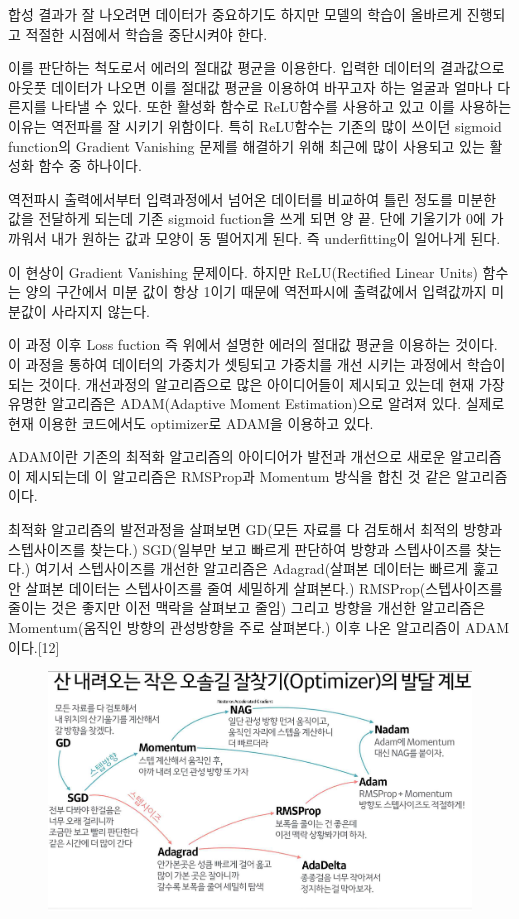 \documentclass{oblivoir}
\begin{document}
합성 결과가 잘 나오려면 데이터가 중요하기도 하지만 모델의 학습이 올바르게 진행되고 적절한 시점에서 학습을 중단시켜야 한다.

이를 판단하는 척도로서 에러의 절대값 평균을 이용한다. 입력한 데이터의 결과값으로 아웃풋 데이터가 나오면 이를 절대값 평균을 이용하여 바꾸고자 하는 얼굴과 얼마나 다른지를 나타낼 수 있다. 또한 활성화 함수로 ReLU함수를 사용하고 있고 이를 사용하는 이유는 역전파를 잘 시키기 위함이다. 특히 ReLU함수는 기존의 많이 쓰이던 sigmoid function의 Gradient Vanishing 문제를 해결하기 위해 최근에 많이 사용되고 있는 활성화 함수 중 하나이다.

역전파시 출력에서부터 입력과정에서 넘어온 데이터를 비교하여 틀린 정도를 미분한 값을 전달하게 되는데 기존 sigmoid fuction을 쓰게 되면 양 끝. 단에 기울기가 0에 가까워서 내가 원하는 값과 모양이 동 떨어지게 된다. 즉 underfitting이 일어나게 된다.

이 현상이 Gradient Vanishing 문제이다. 하지만 ReLU(Rectified Linear Units) 함수는 양의 구간에서 미분 값이 항상 1이기 때문에 역전파시에 출력값에서 입력값까지 미분값이 사라지지 않는다.

이 과정 이후 Loss fuction 즉 위에서 설명한 에러의 절대값 평균을 이용하는 것이다. 이 과정을 통하여 데이터의 가중치가 셋팅되고 가중치를 개선 시키는 과정에서 학습이 되는 것이다. 개선과정의 알고리즘으로 많은 아이디어들이 제시되고 있는데 현재 가장 유명한 알고리즘은 ADAM(Adaptive Moment Estimation)으로 알려져 있다. 실제로 현재 이용한 코드에서도 optimizer로 ADAM을 이용하고 있다.

ADAM이란 기존의 최적화 알고리즘의 아이디어가 발전과 개선으로 새로운 알고리즘이 제시되는데 이 알고리즘은 RMSProp과 Momentum 방식을 합친 것 같은 알고리즘이다.

최적화 알고리즘의 발전과정을 살펴보면 GD(모든 자료를 다 검토해서 최적의 방향과 스텝사이즈를 찾는다.) SGD(일부만 보고 빠르게 판단하여 방향과 스텝사이즈를 찾는다.) 여기서 스텝사이즈를 개선한 알고리즘은 Adagrad(살펴본 데이터는 빠르게 훑고 안 살펴본 데이터는 스텝사이즈를 줄여 세밀하게 살펴본다.) RMSProp(스텝사이즈를 줄이는 것은 좋지만 이전 맥락을 살펴보고 줄임) 그리고 방향을 개선한 알고리즘은 Momentum(움직인 방향의 관성방향을 주로 살펴본다.) 이후 나온 알고리즘이 ADAM이다.[12]

\begin{figure}[h!]
\centering
\includegraphics{pic/chp4/img825}
\end{figure}
\end{document}
